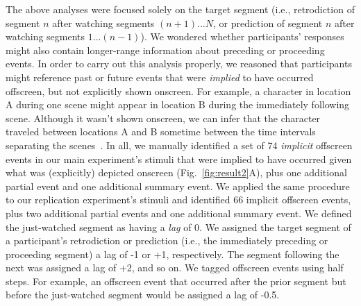 \documentclass[10pt]{article}
\begin{document}
The above analyses were focused solely on the target segment (i.e., retrodiction of segment $n$ after watching segments $(n+1)...N$, or prediction of segment $n$ after watching segments $1 ...(n-1)$). We wondered whether participants' responses might also contain longer-range information about preceding or proceeding events. In order to carry out this analysis properly, we reasoned that participants might reference past or future events that were \textit{implied} to have occurred offscreen, but not explicitly shown onscreen. For example, a character in location A during one scene might appear in location B during the immediately following scene. Although it wasn't shown onscreen, we can infer that the character traveled between locations A and B sometime between the time intervals separating the scenes~\citep{Bord08}. In all, we manually identified a set of 74 \textit{implicit} offscreen events in our main experiment's stimuli that were implied to have occurred given what was (explicitly) depicted onscreen (Fig.~\ref{fig:result2}A), plus one additional partial event and one additional summary event. We applied the same procedure to our replication experiment's stimuli and identified 66 implicit offscreen events, plus two additional partial events and one additional summary event. We defined the just-watched segment as having a \textit{lag} of 0. We assigned the target segment of a participant's retrodiction or prediction (i.e., the immediately preceding or proceeding segment) a lag of -1 or +1, respectively. The segment following the next was assigned a lag of +2, and so on. We tagged offscreen events using half steps. For example, an offscreen event that occurred after the prior segment but before the just-watched segment would be assigned a lag of -0.5.
\end{document}
